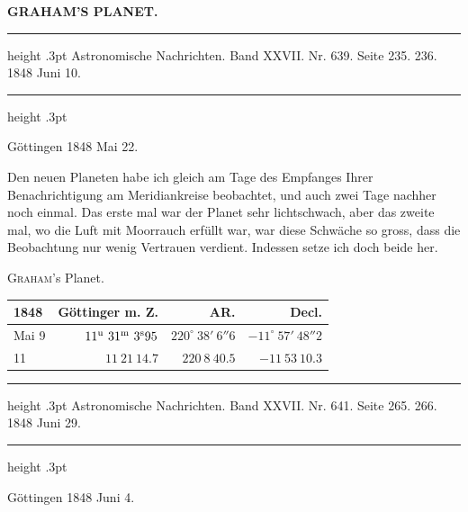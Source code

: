 \clearpage
\begingroup
\pagestyle{empty}
\newcommand{\GaussVIGathering}[2]{%
  \fancypagestyle{gaussVIGathering}{%
    \fancyhf{}%
    \renewcommand{\headrulewidth}{0pt}%
    \renewcommand{\footrulewidth}{0pt}%
    \fancyfoot[C]{\makebox[\textwidth][l]{%
      \hspace*{.025\textwidth}{\footnotesize\bfseries #1}\hfill
      {\normalsize\bfseries\textls[90]{#2}}\hspace*{.18\textwidth}}}%
  }%
  \thispagestyle{gaussVIGathering}%
}
\thispagestyle{empty}
\noindent{}%
\makebox[12mm][l]{}%
\parbox[t]{\dimexpr\linewidth-24mm\relax}{\centering\footnotesize\bfseries GRAHAM’S PLANET.\par}%
\par\nobreak\medskip
\begin{center}
\parbox{.80\linewidth}{%
\centering\small
\hrule height .3pt\relax\vspace{2.5pt}
Astronomische Nachrichten. Band XXVII. Nr. 639. Seite 235. 236. 1848 Juni 10.\par
\vspace{2.5pt}\hrule height .3pt\relax
}
\end{center}
\begin{flushright}Göttingen 1848 Mai\raisebox{.35ex}{,} 22.\end{flushright}

Den neuen Planeten habe ich gleich am Tage des Empfanges Ihrer Benachrichtigung am Meridiankreise beobachtet, und auch zwei Tage nachher noch einmal. Das erste mal war der Planet sehr lichtschwach, aber das zweite mal, wo die Luft mit Moorrauch erfüllt war, war diese Schwäche so gross, dass die Beobachtung nur wenig Vertrauen verdient. Indessen setze ich doch beide her.

\begin{center}
\textsc{Graham}'s Planet.\\[3pt]
\setlength{\tabcolsep}{4pt}
\begin{tabular}{l|r|r|r}
1848 & Göttinger m. Z. & AR. & Decl. \\\hline
Mai 9 & $11^{\rm u}\ 31^{\rm m}\ 3^{\rm s}95$ & $220^\circ\ 38'\ 6''6$ & $-11^\circ\ 57'\ 48''2$ \\
\hfill 11 & $11\ 21\ 14.7$ & $220\ 8\ 40.5$ & $-11\ 53\ 10.3$ \\
\end{tabular}
\end{center}

\par\bigskip
{}
\hypertarget{native-482-june4}{}
\begin{center}
\parbox{.81\linewidth}{%
\centering\small
\hrule height .3pt\relax\vspace{2.5pt}
Astronomische Nachrichten. Band XXVII. Nr. 641. Seite 265. 266. 1848 Juni 29.\par
\vspace{2.5pt}\hrule height .3pt\relax
}
\end{center}
\begin{flushright}Göttingen 1848 Juni 4.\end{flushright}

